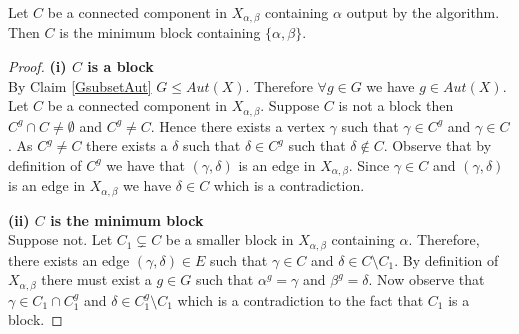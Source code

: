 
\begin{claim}
Let $C$ be a connected component in $X_{\alpha,\beta}$ containing $\alpha$ output by the algorithm. Then $C$ is the minimum block containing $\{\alpha,\beta\}$.  
\end{claim}
\begin{proof}
\textbf{(i) $C$ is a block}\\
By Claim \ref{GsubsetAut} $G\leq Aut(X)$. Therefore $\forall g \in G$ we 
have $g \in Aut(X)$. Let $C$ be a connected component in $X_{\alpha,\beta}$. Suppose $C$ is not a block then $C^g \cap C \neq \emptyset$ and $C^g \neq C$. Hence there exists a vertex $\gamma$ such that $\gamma\in C^g$ and $\gamma \in C$.
As $C^g \neq C$ there exists a $\delta$ such that $\delta\in C^g$ such that $\delta\not\in C$. Observe that by definition of $C^g$ we have that $(\gamma,\delta)$ is an edge in $X_{\alpha,\beta}$. Since $\gamma\in C$ and 
$(\gamma,\delta)$ is an edge in $X_{\alpha,\beta}$ we have $\delta\in C$ which is a contradiction.


%



\textbf{(ii) $C$ is the minimum block}\\ 
Suppose not. Let $C_1 \subsetneq C$ be a smaller block in $X_{\alpha,\beta}$ containing $\alpha$. Therefore, there exists an edge  $(\gamma , \delta) \in E$ such that $\gamma \in C$ and $\delta \in C \setminus C_1$. By definition of $X_{\alpha,\beta}$ there must exist a $g \in G$ such that $\alpha^g = \gamma$ and $\beta^g = \delta$. Now observe that $\gamma\in C_1 \cap C_1^g$ and $\delta\in C_1^g\setminus C_1$ which is a contradiction to the fact that $C_1$ is a block.
\end{proof}
 
